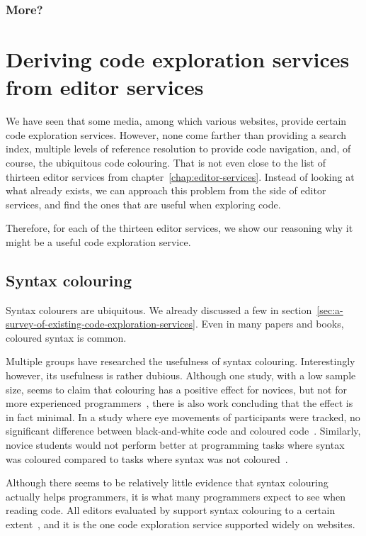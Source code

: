 \subsubsection{More?}

\section{Deriving code exploration services from editor services}

We have seen that some media, among which various websites, provide certain code exploration services.
However, none come farther than providing a search index, multiple levels of reference resolution to provide
code navigation, and, of course, the ubiquitous code colouring.
That is not even close to the list of thirteen editor services from chapter~\ref{chap:editor-services}.
Instead of looking at what already exists, we can approach this problem from the side of editor services, and find the
ones that are useful when exploring code.

Therefore, for each of the thirteen editor services, we show our reasoning why it might be a useful code exploration service.

\subsection*{Syntax colouring}

Syntax colourers are ubiquitous.
We already discussed a few in section~\ref{sec:a-survey-of-existing-code-exploration-services}.
Even in many papers and books, coloured syntax is common.

Multiple groups have researched the usefulness of syntax colouring.
Interestingly however, its usefulness is rather dubious.
Although one study, with a low sample size, seems to claim that colouring has a positive effect for novices, but not for
more experienced programmers~\autocite{Sarkar15a-0}, there is also work concluding that the effect is in fact minimal.
In a study where eye movements of participants were tracked, no significant difference between black-and-white code and coloured code~\autocite{beelders2016syntax}.
Similarly, novice students would not perform better at programming tasks where syntax was coloured compared to tasks where syntax was not coloured~\autocite{HannebauerHG18}.

Although there seems to be relatively little evidence that syntax colouring actually helps programmers,
it is what many programmers expect to see when reading code.
All editors evaluated by \citeauthor{Pelsmaeker2018} support syntax colouring to a certain extent~\autocite{Pelsmaeker2018},
and it is the one code exploration service supported widely on websites.

